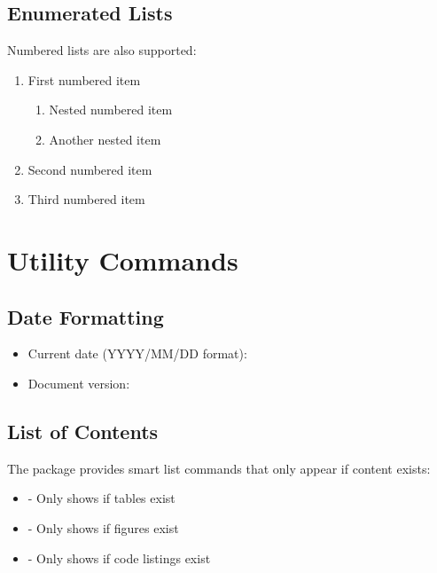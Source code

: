 \documentclass[11pt,letterpaper]{article}
\begin{document}
\subsection{Enumerated Lists}

Numbered lists are also supported:

\begin{enumerate}
    \item First numbered item
          \begin{enumerate}
              \item Nested numbered item
              \item Another nested item
          \end{enumerate}
    \item Second numbered item
    \item Third numbered item
\end{enumerate}

\section{Utility Commands}

\subsection{Date Formatting}

\begin{itemize}
    \item Current date (YYYY/MM/DD format): \todayymd
    \item Document version: \docversion
\end{itemize}

\subsection{List of Contents}

The package provides smart list commands that only appear if content exists:

\begin{itemize}
    \item {} - Only shows if tables exist
    \item {} - Only shows if figures exist
    \item {} - Only shows if code listings exist
\end{itemize}
\end{document}
